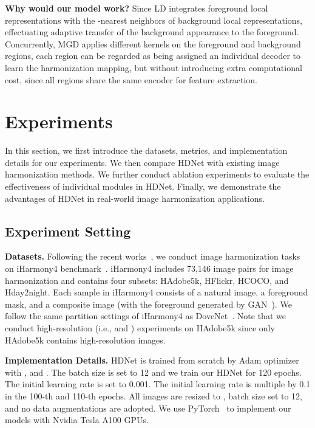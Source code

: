 \documentclass[sigconf]{acmart}
\begin{document}
\textbf{Why would our model work?} Since LD integrates foreground local representations with the -nearest neighbors of background local representations, effectuating adaptive transfer of the background appearance to the foreground. Concurrently, MGD applies different kernels on the foreground and background regions, each region can be regarded as being assigned an individual decoder to learn the harmonization mapping, but without introducing extra computational cost, since all regions share the same encoder for feature extraction. 



\section{Experiments}
In this section, we first introduce the datasets, metrics, and implementation details for our experiments. We then compare HDNet with existing image harmonization methods. We further conduct ablation experiments to evaluate the effectiveness of individual modules in HDNet. Finally, we demonstrate the advantages of HDNet in real-world image harmonization applications.
\subsection{Experiment Setting}

\noindent
\textbf{Datasets.} Following the recent works~\cite{Bargainnet,RAIN,DoveNet}, we conduct image harmonization tasks on iHarmony4 benchmark~\cite{DoveNet}. iHarmony4 includes 73,146 image pairs for image harmonization and contains four subsets: HAdobe5k, HFlickr, HCOCO, and Hday2night. Each sample in iHarmony4 consists of a natural image, a foreground mask, and a composite image (with the foreground generated by GAN~\cite{GAN}). We follow the same partition settings of iHarmony4 as DoveNet~\cite{DoveNet}. Note that we conduct high-resolution (i.e.,  and ) experiments on HAdobe5k since only HAdobe5k contains high-resolution images.

\noindent
\textbf{Implementation Details.}
HDNet is trained from scratch by Adam optimizer with , and . The batch size is set to 12 and we train our HDNet for 120 epochs. The initial learning rate is set to 0.001. The initial learning rate is multiple by 0.1 in the 100-th and 110-th epochs. All images are resized to , batch size set to 12, and no data augmentations are adopted. We use PyTorch~\cite{paszke2019pytorch} to implement our models with Nvidia Tesla A100 GPUs.
\end{document}
